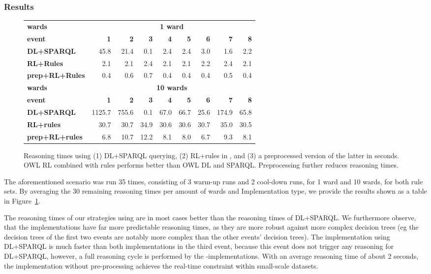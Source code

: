 \subsubsection{Results}
\begin{figure}  
\begin{center}
\begin{tabular}[b]{l| rrrrrrrr }
 \hline
 \bf wards&\multicolumn{8}{c}{\bf 1 ward} \\
 \bf event&\bf1&\bf2&\bf3&\bf4&\bf5&\bf6&\bf7&\bf8\\ 
   \hline
\bf  DL+SPARQL
  &45.8
  &21.4
  &0.1
  &2.4
  &2.4
  &3.0
  &1.6
  &2.2
  \\
\bf   RL+Rules 
&2.1&
2.1&
2.4&
2.1&
2.1&
2.2&
2.4&
2.1
\\
 \bf  prep+RL+Rules &
0.4&
0.6&
0.7&
0.4&
0.4&
0.4&
0.5&
0.4
 \\
  \hline
 \bf wards& \multicolumn{8}{c}{\bf 10 wards} \\
 \bf event& \bf1&\bf2&\bf3&\bf4&\bf5&\bf6&\bf7&\bf8\\
     \hline
 \bf DL+SPARQL
  &1125.7
&755.6
&0.1
&67.0
&66.7
&25.6
&174.9
&65.8
  \\
  \bf RL+rules 
 & 30.7&
30.7&
34.9&
30.6&
30.6&
30.7&
35.0&
30.5
\\
 \bf  prep+RL+rules &
  6.8&
10.7&
12.2&
8.1&
8.0&
6.7&
9.3&
8.1
 \\
  \hline
\end{tabular}
\end{center}
\caption{Reasoning times using (1) DL+SPARQL querying, 
(2) RL+rules in \nthree, and (3) a preprocessed version of the latter in seconds. OWL RL combined with rules performs better than OWL DL and SPARQL.
Preprocessing further reduces reasoning times.}
\label{fig:resultstable}
\end{figure}
The aforementioned scenario was run 35 times, consisting of 3 warm-up runs and 2 cool-down runs, for 1 ward and 10 wards, for both rule sets.
By averaging the 30 remaining reasoning times per amount of wards and Implementation type, we provide the results shown as a table in Figure~\ref{fig:resultstable}. 


The reasoning times of our strategies using \nthree are in most cases better than the reasoning times of DL+SPARQL. 
We furthermore observe, that the \nthree implementations have far 
more predictable reasoning times, as they are more robust against more complex decision trees
(eg the decision trees of the first two events are notably more complex than the other events' decision trees).
The implementation using DL+SPARQL is much faster than both \nthree implementations in the third event, because this event does not trigger any reasoning for DL+SPARQL, however, 
a full reasoning cycle is performed by the \nthree-implementations. 
With an average reasoning time of about 2 seconds, the \nthree implementation without pre-processing achieves the real-time constraint within small-scale datasets.

